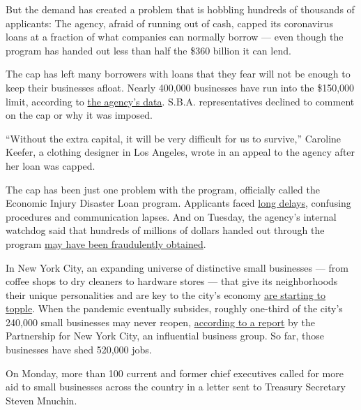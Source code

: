 But the demand has created a problem that is hobbling hundreds of
thousands of applicants: The agency, afraid of running out of cash,
capped its coronavirus loans at a fraction of what companies can
normally borrow --- even though the program has handed out less than
half the \$360 billion it can lend.

The cap has left many borrowers with loans that they fear will not be
enough to keep their businesses afloat. Nearly 400,000 businesses have
run into the \$150,000 limit, according to
\href{https://www.sba.gov/funding-programs/loans/coronavirus-relief-options/economic-injury-disaster-loans\#section-header-5}{the
agency's data}. S.B.A. representatives declined to comment on the cap or
why it was imposed.

``Without the extra capital, it will be very difficult for us to
survive,'' Caroline Keefer, a clothing designer in Los Angeles, wrote in
an appeal to the agency after her loan was capped.

The cap has been just one problem with the program, officially called
the Economic Injury Disaster Loan program. Applicants faced
\href{https://www.nytimes.com/2020/04/09/business/smallbusiness/small-business-disaster-loans-coronavirus.html}{long
delays}, confusing procedures and communication lapses. And on Tuesday,
the agency's internal watchdog said that hundreds of millions of dollars
handed out through the program
\href{https://www.nytimes.com/live/2020/07/28/business/stock-market-today-coronavirus\#thieves-are-targeting-small-business-relief-programs-a-watchdog-says}{may
have been fraudulently obtained}.

In New York City, an expanding universe of distinctive small businesses
--- from coffee shops to dry cleaners to hardware stores --- that give
its neighborhoods their unique personalities and are key to the city's
economy
\href{https://www.nytimes.com/2020/08/03/nyregion/nyc-small-businesses-closing-coronavirus.html}{are
starting to topple}. When the pandemic eventually subsides, roughly
one-third of the city's 240,000 small businesses may never reopen,
\href{https://pfnyc.org/wp-content/uploads/2020/07/actionandcollaboration.pdf}{according
to a report} by the Partnership for New York City, an influential
business group. So far, those businesses have shed 520,000 jobs.

On Monday, more than 100 current and former chief executives called for
more aid to small businesses across the country in a letter sent to
Treasury Secretary Steven Mnuchin.

